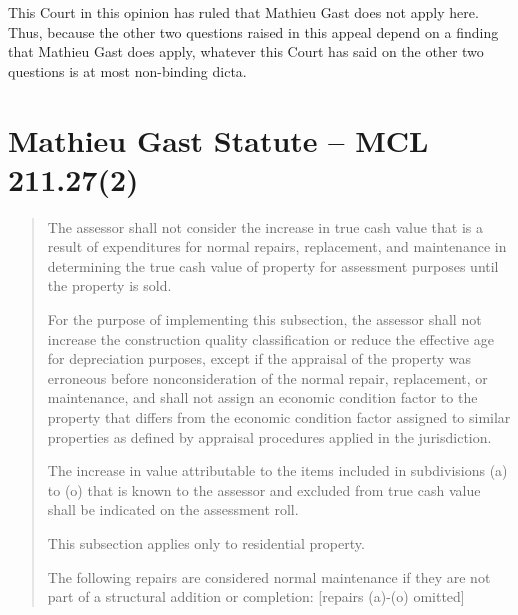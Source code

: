 \documentclass[12pt,\documentclassflag]{michiganCourtOfAppealsBrief}
\begin{document}
This Court in this opinion has ruled that Mathieu Gast does not apply here.
Thus, because the other two questions raised in this appeal depend on a finding that Mathieu Gast does apply, whatever this Court has said on the other two questions is at most non-binding dicta.

\section{Mathieu Gast Statute -- MCL 211.27(2)}
\begin{quotation}
The assessor shall not consider the increase in true cash value that is a result of expenditures for normal repairs, replacement, and maintenance in determining the true cash value of property for assessment purposes until the property is sold.

For the purpose of implementing this subsection, the assessor shall not increase the construction quality classification or reduce the effective age for depreciation purposes, except if the appraisal of the property was erroneous before nonconsideration of the normal repair, replacement, or maintenance, and shall not assign an economic condition factor to the property that differs from the economic condition factor assigned to similar properties as defined by appraisal procedures applied in the jurisdiction.

The increase in value attributable to the items included in subdivisions (a) to (o) that is known to the assessor and excluded from true cash value shall be indicated on the assessment roll.

This subsection applies only to residential property.

The following repairs are considered normal maintenance if they are not part of a structural addition or completion: [repairs (a)-(o) omitted]

\end{quotation}
\end{document}

